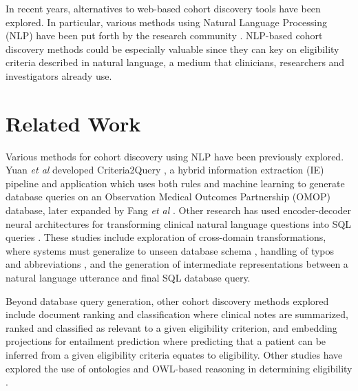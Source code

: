 \documentclass[../main.tex]{subfiles}
\begin{document}
In recent years, alternatives to web-based cohort discovery tools have been explored. In particular, various methods using Natural Language Processing (NLP) have been put forth by the research community \cite{yuan2019criteria2query, soni2020patient, fang2022combining, zhang2020deepenroll, chen2019clinical, patrao2015recruit, dhayne2021emr2vec, liu2021evaluating, xiong2019cohort}. NLP-based cohort discovery methods could be especially valuable since they can key on eligibility criteria described in natural language, a medium that clinicians,  researchers and investigators already use.

\section{Related Work}

Various methods for cohort discovery using NLP have been previously explored. Yuan \textit{et al} developed Criteria2Query \cite{yuan2019criteria2query}, a hybrid information extraction (IE) pipeline and application which uses both rules and machine learning to generate database queries on an Observation Medical Outcomes Partnership (OMOP) \cite{hripcsak2015observational} database, later expanded by Fang \textit{et al} \cite{fang2022combining}. Other research has used encoder-decoder neural architectures for transforming clinical natural language questions into SQL queries \cite{bae2021question, park2021knowledge, wang2020text, pan2021bert, dhayne2021emr2vec}. These studies include exploration of cross-domain transformations, where systems must generalize to unseen database schema \cite{park2021knowledge}, handling of typos and abbreviations \cite{bae2021question}, and the generation of intermediate representations between a natural language utterance and final SQL database query.\cite{pan2021bert} 

Beyond database query generation, other cohort discovery methods explored include document ranking and classification \cite{chen2019clinical,soni2020patient} where clinical notes are summarized, ranked and classified as relevant to a given eligibility criterion, and embedding projections for entailment prediction \cite{dhayne2021emr2vec, zhang2020deepenroll} where predicting that a patient can be inferred from a given eligibility criteria equates to eligibility. Other studies have explored the use of ontologies and OWL-based reasoning in determining eligibility \cite{patel2007matching, huang2013semanticct, baader2018patient, johnson2016mimic, patrao2015recruit}.
    
\end{document}
